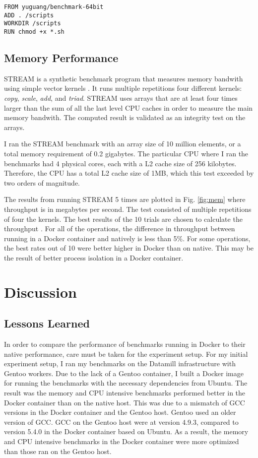 \documentclass[11pt]{article}
\begin{document}
\begin{itemize}
\begin{lstlisting}
FROM yuguang/benchmark-64bit
ADD . /scripts
WORKDIR /scripts
RUN chmod +x *.sh
\end{lstlisting}


\subsection{Memory Performance}
STREAM is a synthetic benchmark program that measures memory bandwith using simple vector kernels \cite{mccalpin}. It runs multiple repetitions four different kernels: \textit{copy}, \textit{scale}, \textit{add}, and \textit{triad}. STREAM uses arrays that are at least four times larger than the sum of all the last level CPU caches in order to measure the main memory bandwith. The computed result is validated as an integrity test on the arrays. 


I ran the
STREAM benchmark with an array size of 10 million elements, or
a total memory requirement of 0.2 gigabytes. The particular CPU
where I ran the benchmarks had 4 physical cores, each with a L2 cache size of 256 kilobytes. 
Therefore, the CPU has a total L2 cache size of 1MB, which this test exceeded by
two orders of magnitude.

The results from running STREAM 5 times are plotted in Fig. \ref{fig:mem} where throughput is in megabytes per second. 
The test consisted of multiple repetitions of four the kernels. The best results of the 10 trials are chosen to calculate the throughput \cite{mccalpin}. 
For all of the operations, the difference in throughput between running in a Docker container and natively is less than 5\%. For some operations, the best rates out of 10 were better higher in Docker than on native. This may be the result of better process isolation in a Docker container. 

\section{Discussion}

\subsection{Lessons Learned}
In order to compare the performance of benchmarks running in Docker to their native performance, care must be taken for the experiment setup. For my initial experiment setup, I ran my benchmarks on the Datamill infrastructure with Gentoo workers. Due to the lack of a Gentoo container, I built a Docker image for running the benchmarks with the necessary dependencies from Ubuntu. The result was the memory and CPU intensive benchmarks performed better in the Docker container than on the native host. This was due to a mismatch of GCC versions in the Docker container and the Gentoo host. Gentoo used an older version of GCC. GCC on the Gentoo host were at version 4.9.3, compared to version 5.4.0 in the Docker container based on Ubuntu. As a result, the memory and CPU intensive benchmarks in the Docker container were more optimized than those ran on the Gentoo host. 


\end{itemize}
\end{document}

